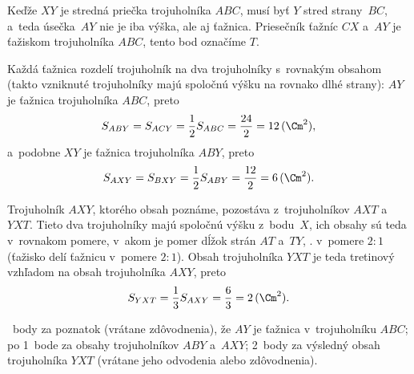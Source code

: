 {%
Keďže $XY$ je stredná priečka trojuholníka $ABC$, musí byť $Y$ stred strany~$BC$,
a~teda úsečka~$AY$ nie je iba výška, ale aj ťažnica.
Priesečník ťažníc $CX$ a~$AY$ je ťažiskom trojuholníka $ABC$, tento bod označíme $T$.

Každá ťažnica rozdelí trojuholník na dva trojuholníky s~rovnakým obsahom (takto
vzniknuté trojuholníky majú spoločnú výšku na rovnako dlhé strany):
$AY$ je ťažnica trojuholníka $ABC$, preto
$$
S_{ABY}=S_{ACY}=\frac12S_{ABC}=\frac{24}2=12\,(\Cm^2),
$$
a~podobne $XY$ je ťažnica trojuholníka $ABY$, preto
$$
S_{AXY}=S_{BXY}=\frac12S_{ABY}=\frac{12}2=6\,(\Cm^2).
$$

Trojuholník $AXY$, ktorého obsah poznáme, pozostáva z~trojuholníkov $AXT$ a~$YXT$.
Tieto dva trojuholníky majú spoločnú výšku z~bodu~$X$, ich obsahy sú
teda v~rovnakom pomere, v~akom je pomer dĺžok strán $AT$ a~$TY$,
\tj. v~pomere $2:1$ (ťažisko delí ťažnicu v~pomere $2:1$).
Obsah trojuholníka $YXT$ je teda tretinový vzhľadom na obsah trojuholníka $AXY$, preto
$$
S_{YXT}=\frac13S_{AXY}=\frac63=2\,(\Cm^2).
$$

~body za poznatok (vrátane zdôvodnenia), že $AY$ je ťažnica v~trojuholníku
$ABC$;
po 1~bode za obsahy trojuholníkov $ABY$ a~$AXY$;
2~body za výsledný obsah trojuholníka $YXT$ (vrátane jeho odvodenia alebo
zdôvodnenia).
\endhodnotenie
}

